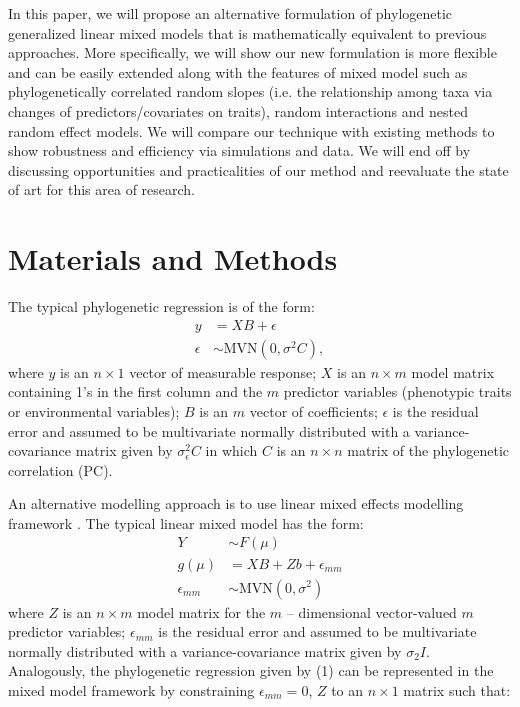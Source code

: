 In this paper, we will propose an alternative formulation of phylogenetic generalized linear mixed models that is mathematically equivalent to previous approaches. 
More specifically, we will show our new formulation is more flexible and can be easily extended along with the features of mixed model such as phylogenetically correlated random slopes (i.e. the relationship among taxa via changes of predictors/covariates on traits), random interactions  and nested random effect models.
We will compare our technique with existing methods to show robustness and efficiency via simulations and data.
We will end off by discussing opportunities and practicalities of our method and reevaluate the state of art for this area of research. 

\section{Materials and Methods}

The typical phylogenetic regression is of the form:
\begin{align}
y & = XB + \epsilon \label{eq:gls1} \\ 
\epsilon & \sim \textrm{MVN}(0,\sigma^{2}C), \label{eq:gls2}
\end{align}
where $y$ is an $n \times 1$ vector of measurable response; $X$ is an $n \times m$ model matrix containing 1's in the first column and the $m$ predictor variables (phenotypic traits or environmental variables); $B$ is an $m$ vector of coefficients; $\epsilon$ is the residual error and assumed to be multivariate normally distributed with a variance-covariance matrix given by $\sigma^{2}_{\epsilon}C$ in which $C$ is an $n \times n$ matrix of the phylogenetic correlation (PC).

An alternative modelling approach is to use linear mixed effects modelling framework \citep{lynch1991methods}.
The typical linear mixed model has the form:
\begin{align}
Y & \sim F(\mu) \label{eq:glmm1} \\
g(\mu) & = XB + Zb + \epsilon_{mm} \label{eq:glmm2} \\
\epsilon_{mm} & \sim \textrm{MVN}(0,\sigma^2) \label{eq:glmm3}
\end{align}
where $Z$ is an $n \times m$ model matrix for the $m$ -- dimensional vector-valued $m$ predictor variables; $\epsilon_{mm}$ is the residual error and assumed to be multivariate normally distributed with a variance-covariance matrix given by $\sigma_{2}I$.
Analogously, the phylogenetic regression given by (1) can be represented in the mixed model framework by constraining $\epsilon_{mm} = 0$, $Z$ to an $n \times 1$ matrix such that: 

